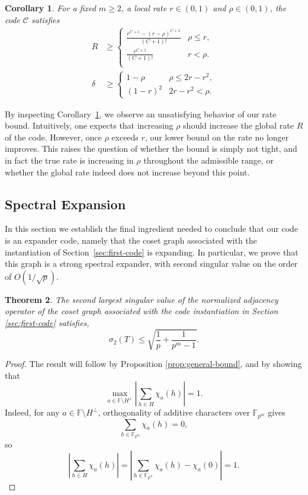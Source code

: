 \documentclass[11pt]{article}
\theoremstyle{plain}
\newtheorem{theorem}{Theorem}[section]
\newtheorem{corollary}[theorem]{Corollary}
\theoremstyle{definition}
\newcommand{\abs}[1]{\left|#1\right|}
\begin{document}
\begin{corollary}
\label{cor:optimal_tradeoff}
For a fixed $m \ge 2$, a  local rate $r \in (0, 1)$ and $\rho\in (0,1)$, the code $\mathcal{C}$ satisfies 
$$
\begin{aligned}
R &\ge
\begin{cases}
   \frac{r^{C+1} - (r-\rho)^{C+1}}{(C+1)!} & \rho\le r,\\
   \frac{r^{C+1}}{(C+1)!} & r<\rho.\\
\end{cases}\\
\delta &\ge
\begin{cases}
    1-\rho & \rho\le 2r-r^2,\\
     (1-r)^2 & 2r-r^2<\rho.
\end{cases}
\end{aligned}
$$
\end{corollary}
By inspecting Corollary~\ref{cor:optimal_tradeoff}, we observe an unsatisfying behavior of our rate bound. Intuitively, one expects that increasing $\rho$ should increase the global rate $R$ of the code. However, once $\rho$ exceeds $r$, our lower bound on the rate no longer improves. This raises the question of whether the bound is simply not tight, and in fact the true rate is increasing in $\rho$ throughout the admissible range, or whether the global rate indeed does not increase beyond this point.
\subsection{Spectral Expansion}
In this section we establish the final ingredient needed to conclude that our code is an expander code, namely that the coset graph associated with the instantiation of Section~\ref{sec:first-code} is expanding. In particular, we prove that this graph is a strong spectral expander, with second singular value on the order of $O(1/\sqrt{p})$.

\begin{theorem}
\label{thm:spectral-bound}
The second largest singular value of the normalized adjacency operator of the coset graph associated with the code instantiation in Section \ref{sec:first-code}  satisfies,
    \[
        \sigma_2(T) \le \sqrt{\frac{1}{p}+\frac{1}{p^m-1}}.
    \]
\end{theorem}

\begin{proof}
 The result will follow by 
 Proposition \ref{prop:general-bound}, and by showing that  
 \[
        \max_{a\in \mathbb{F}\setminus H^\perp } \left| \sum_{h \in H} \chi_a(h) \right|=1.
    \] 
 Indeed, for any $a\in \mathbb{F}\setminus H^\perp$, orthogonality of additive characters over $\mathbb{F}_{p^m}$ gives
$$
\sum_{h\in \mathbb{F}_{p^m}}\chi_a(h)=0,
$$
so
$$
\abs{\sum_{h\in H}\chi_{a}(h)}
=\abs{\sum_{h\in \mathbb{F}_{p^m}}\chi_{a}(h)-\chi_a(0)}
=1.
$$
 \end{proof}
\end{document}
